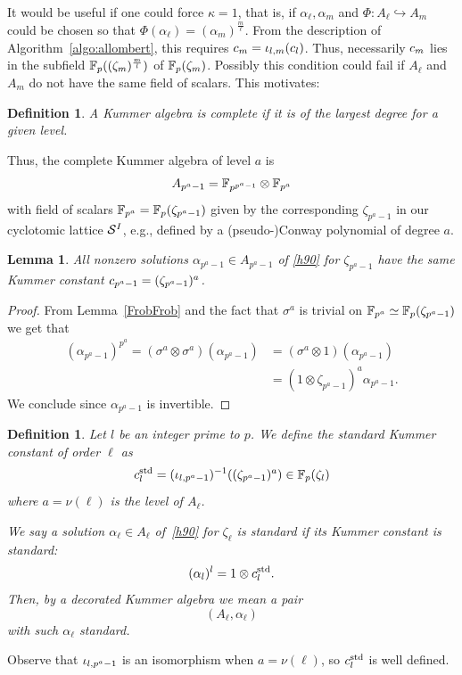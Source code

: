 \documentclass[sigconf]{acmart}
\newtheorem{lemma}[theorem]{Lemma}
\newtheorem{definition}[theorem]{Definition}
\begin{document}
It would be useful if one could force $\kappa=1$, that is, if $\alpha_\ell,\alpha_m$
and $\Phi:A_\ell\hookrightarrow A_m$
could be chosen so that $\Phi(\alpha_\ell)=(\alpha_m)^{\frac{m}{\ell}}$.
From the description of Algorithm~\ref{algo:allombert},
this requires $c_m={\iota_{{l},{m}}}(c_l)$.
Thus,
necessarily $c_m$ lies in the subfield $\mathbb{F}_{p}((\zeta_m)^{\frac{m}{l}})$ of $\mathbb{F}_{p}(\zeta_m)$.
Possibly this condition could fail if $A_\ell$ and $A_m$ do not have the same field of scalars.
This motivates:
\begin{definition}
\label{complete}
A Kummer algebra is \emph{complete} if it is of the largest degree for a given level.
\end{definition}
Thus, the complete Kummer algebra of level $a$ is
\[ A_{p^a-1}=\mathbb{F}_{p^{p^a-1}}\otimes\mathbb{F}_{p^a} \]
with field of scalars $\mathbb{F}_{p^a}=\mathbb{F}_{p}(\zeta_{p^a-1})$ given by the corresponding $\zeta_{p^a-1}$ in our cyclotomic lattice $\mathcal{S}^{I}$,
e.g., defined by a (pseudo-)Conway polynomial of degree $a$.
\begin{lemma}
\label{Kummer_bizarre}
All nonzero solutions $\alpha_{p^a-1}\in A_{p^a-1}$ of \eqref{h90} for $\zeta_{p^a-1}$
have the same Kummer constant $c_{p^a-1}=(\zeta_{p^a-1})^a$.
\end{lemma}
\begin{proof}
  From Lemma~\ref{FrobFrob} and the fact that $\sigma^a$ is trivial on
  $\mathbb{F}_{p^a}\simeq\mathbb{F}_{p}(\zeta_{p^a-1})$ we get that
\begin{equation*}
\begin{split}
(\alpha_{p^a-1})^{p^a}=(\sigma^a\otimes\sigma^a)(\alpha_{p^a-1})&=(\sigma^a\otimes1)(\alpha_{p^a-1})\\
&=(1\otimes\zeta_{p^a-1})^a\alpha_{p^a-1}.
\end{split}
\end{equation*}
We conclude since $\alpha_{p^a-1}$ is invertible.
\end{proof}
\begin{definition}
\label{alphastandard}
Let $l$ be an integer prime to $p$.
We define the \emph{standard} Kummer constant of order $\ell$ as
\[ c^{\mathrm{std}}_{l}=({\iota_{{l},{p^a-1}}})^{-1}((\zeta_{p^a-1})^a)\in\mathbb{F}_p(\zeta_l) \]
where $a=\nu(\ell)$ is the level of $A_\ell$.

We say a solution $\alpha_\ell\in A_\ell$ of~\eqref{h90} for $\zeta_\ell$ is
\emph{standard} if its Kummer constant is standard:
\[ (\alpha_l)^l=1\otimes c^{\mathrm{std}}_{l}. \]
Then, by a \emph{decorated} Kummer algebra we mean a pair
\[ (A_\ell,\alpha_{\ell}) \]
with such $\alpha_\ell$ standard.
\end{definition}
Observe that ${\iota_{{l},{p^a-1}}}$ is an isomorphism when $a=\nu(\ell)$,
so $c^{\mathrm{std}}_l$ is well defined.
\end{document}
